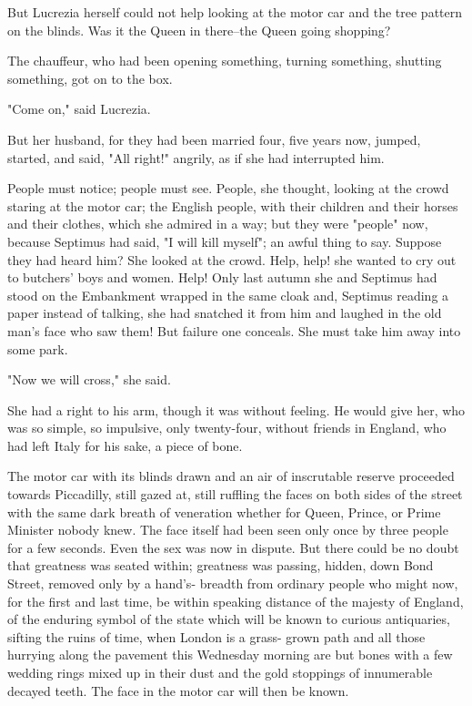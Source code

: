 \documentclass[lang=cn,10pt]{elegantbook}
\begin{document}
But Lucrezia herself could not help looking at the motor car and
the tree pattern on the blinds.  Was it the Queen in there--the
Queen going shopping?

The chauffeur, who had been opening something, turning something,
shutting something, got on to the box.

"Come on," said Lucrezia.

But her husband, for they had been married four, five years now,
jumped, started, and said, "All right!" angrily, as if she had
interrupted him.

People must notice; people must see.  People, she thought, looking
at the crowd staring at the motor car; the English people, with
their children and their horses and their clothes, which she
admired in a way; but they were "people" now, because Septimus had
said, "I will kill myself"; an awful thing to say.  Suppose they
had heard him?  She looked at the crowd.  Help, help! she wanted to
cry out to butchers' boys and women.  Help!  Only last autumn she
and Septimus had stood on the Embankment wrapped in the same cloak
and, Septimus reading a paper instead of talking, she had snatched
it from him and laughed in the old man's face who saw them!  But
failure one conceals.  She must take him away into some park.

"Now we will cross," she said.

She had a right to his arm, though it was without feeling.  He
would give her, who was so simple, so impulsive, only twenty-four,
without friends in England, who had left Italy for his sake, a
piece of bone.

The motor car with its blinds drawn and an air of inscrutable
reserve proceeded towards Piccadilly, still gazed at, still
ruffling the faces on both sides of the street with the same dark
breath of veneration whether for Queen, Prince, or Prime Minister
nobody knew.  The face itself had been seen only once by three
people for a few seconds.  Even the sex was now in dispute.  But
there could be no doubt that greatness was seated within; greatness
was passing, hidden, down Bond Street, removed only by a hand's-
breadth from ordinary people who might now, for the first and last
time, be within speaking distance of the majesty of England, of the
enduring symbol of the state which will be known to curious
antiquaries, sifting the ruins of time, when London is a grass-
grown path and all those hurrying along the pavement this Wednesday
morning are but bones with a few wedding rings mixed up in their
dust and the gold stoppings of innumerable decayed teeth.  The face
in the motor car will then be known.
\end{document}
